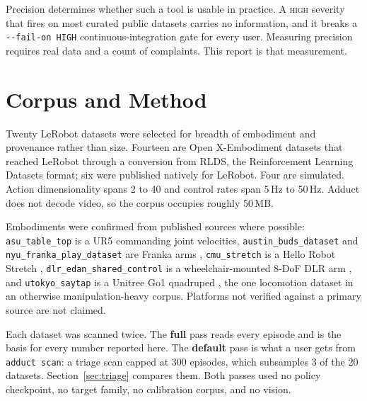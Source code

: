 \documentclass[10pt,a4paper]{article}
\newcommand{\dtr}[1]{\texttt{\small #1}}
\begin{document}
Precision determines whether such a tool is usable in practice. A \textsc{high} severity
that fires on most curated public datasets carries no information, and it breaks a
\texttt{-{}-fail-on HIGH} continuous-integration gate for every user. Measuring precision
requires real data and a count of complaints. This report is that measurement.

\section{Corpus and Method}

Twenty LeRobot datasets were selected for breadth of embodiment and provenance rather than
size. Fourteen are Open X-Embodiment datasets \cite{oxe} that reached LeRobot through a
conversion from RLDS, the Reinforcement Learning Datasets format; six were published
natively for LeRobot. Four are simulated. Action
dimensionality spans 2 to 40 and control rates span 5\,Hz to 50\,Hz. Adduct does not decode
video, so the corpus occupies roughly 50\,MB.

Embodiments were confirmed from published sources where possible: \dtr{asu\_table\_top} is
a UR5 commanding joint velocities, \dtr{austin\_buds\_dataset} and
\dtr{nyu\_franka\_play\_dataset} are Franka arms \cite{tfds},
\dtr{cmu\_stretch} is a Hello Robot Stretch \cite{stretch}, \dtr{dlr\_edan\_shared\_control}
is a wheelchair-mounted 8-DoF DLR arm \cite{edan}, and \dtr{utokyo\_saytap} is a Unitree Go1
quadruped \cite{saytap}, the one locomotion dataset in an otherwise manipulation-heavy
corpus. Platforms not verified against a primary source are not claimed.

Each dataset was scanned twice. The \textbf{full} pass reads every episode and is the basis
for every number reported here. The \textbf{default} pass is what a user gets from
\texttt{adduct scan}: a triage scan capped at 300 episodes, which subsamples 3 of the 20
datasets. Section~\ref{sec:triage} compares them. Both passes used no policy checkpoint, no
target family, no calibration corpus, and no vision.
\end{document}
